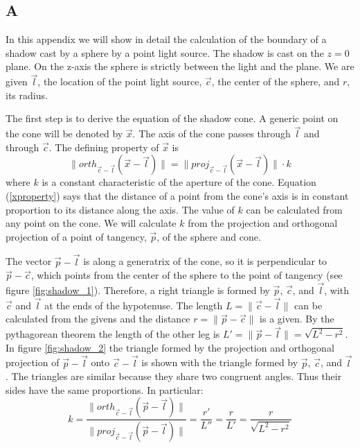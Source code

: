\documentclass[10pt]{article}
\begin{document}
\begin{appendices}
\chapter{A} \label{a}

In this appendix we will show in detail the calculation of the boundary of a shadow cast by a sphere by a point light source. The shadow is cast on the $z=0$ plane. On the z-axis the sphere is strictly between the light and the plane. We are given $\vec{l}$, the location of the point light source, $\vec{c}$, the center of the sphere, and $r$, its radius.

The first step is to derive the equation of the shadow cone. A generic point on the cone will be denoted by $\vec{x}$. The axis of the cone passes through $\vec{l}$ and through $\vec{c}$. The defining property of $\vec{x}$ is 
\begin{equation}\label{xproperty}
\|orth_{\vec{c}-\vec{l}} (\vec{x} - \vec{l})\| = \|proj_{\vec{c}-\vec{l}} (\vec{x} - \vec{l})\| \cdot k
\end{equation}
where $k$ is a constant characteristic of the aperture of the cone. Equation (\ref{xproperty}) says that the distance of a point from the cone's axis is in constant proportion to its distance along the axis. The value of $k$ can be calculated from any point on the cone. We will calculate $k$ from the projection and orthogonal projection of a point of tangency, $\vec{p}$, of the sphere and cone.

The vector $\vec{p} - \vec{l}$ is along a generatrix of the cone, so it is perpendicular to $\vec{p} - \vec{c}$, which points from the center of the sphere to the point of tangency (see figure \ref{fig:shadow_1}). Therefore, a right triangle is formed by $\vec{p}$, $\vec{c}$, and $\vec{l}$, with $\vec{c}$ and $\vec{l}$ at the ends of the hypotenuse. The length $L=\|\vec{c}-\vec{l}\|$ can be calculated from the givens and the distance $r=\|\vec{p}-\vec{c}\|$ is a given. By the pythagorean theorem the length of the other leg is $L'=\|\vec{p}-\vec{l}\|=\sqrt{L^2-r^2}$. In figure \ref{fig:shadow_2} the triangle formed by the projection and orthogonal projection of $\vec{p}-\vec{l}$ onto $\vec{c}-\vec{l}$ is shown with the triangle formed by $\vec{p}$, $\vec{c}$, and $\vec{l}$. The triangles are similar because they share two congruent angles. Thus their sides have the same proportions. In particular:
\[
k = \frac{\|orth_{\vec{c}-\vec{l}} (\vec{p} - \vec{l})\|}{\|proj_{\vec{c}-\vec{l}} (\vec{p} - \vec{l})\|} = \frac{r'}{L''} = \frac{r}{L'} = \frac{r}{\sqrt{L^2-r^2}}
\]


\end{appendices}
\end{document}
